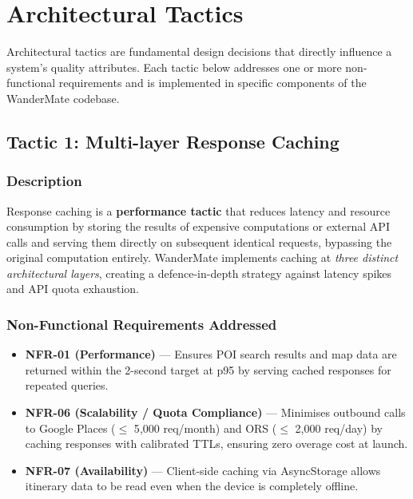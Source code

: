\documentclass[12pt, a4paper]{article}
\begin{document}
\section{Architectural Tactics}

Architectural tactics are fundamental design decisions that directly influence a system's quality attributes. Each tactic below addresses one or more non-functional requirements and is implemented in specific components of the WanderMate codebase.

\subsection{Tactic 1: Multi-layer Response Caching}

\subsubsection{Description}

Response caching is a \textbf{performance tactic} that reduces latency and resource consumption by storing the results of expensive computations or external API calls and serving them directly on subsequent identical requests, bypassing the original computation entirely. WanderMate implements caching at \emph{three distinct architectural layers}, creating a defence-in-depth strategy against latency spikes and API quota exhaustion.

\subsubsection{Non-Functional Requirements Addressed}

\begin{itemize}
  \item \textbf{NFR-01 (Performance)} --- Ensures POI search results and map data are returned within the 2-second target at p95 by serving cached responses for repeated queries.
  \item \textbf{NFR-06 (Scalability / Quota Compliance)} --- Minimises outbound calls to Google Places ($\leq$ 5{,}000 req/month) and ORS ($\leq$ 2{,}000 req/day) by caching responses with calibrated TTLs, ensuring zero overage cost at launch.
  \item \textbf{NFR-07 (Availability)} --- Client-side caching via AsyncStorage allows itinerary data to be read even when the device is completely offline.
\end{itemize}
\end{document}
